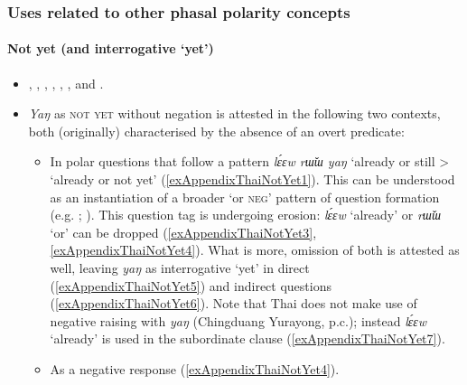 \subsubsection{Uses related to other phasal polarity concepts}
\paragraph{Not yet (and interrogative \lq yet\rq)}
\label{appendixThaiNotYet}
	\begin{itemize}
		\item  \Textcite[62]{vanBaar1997}, \textcite[97–100]{CampbellShaweevongs1982}, \textcite[60, 93, 98]{HigbieThinsan2002}, \textcite[284–286]{IwasakiIngkaphirom2005}, \textcite{Jenny2001}, \textcite[81, 84, 182–183]{Noss1964}, and \textcite[113, 150, 153, 157–159]{Smyth2002}.
		\item \textit{Yaŋ} as \textsc{not yet} without negation is attested in the following two contexts, both (originally) characterised by the absence of an overt predicate:
		\begin{itemize}
			\item In polar questions that follow a pattern \textit{lɛ́ɛw rɯ̌ɯ yaŋ} \lq already or still > \lq already or not yet\rq{ }(\ref{exAppendixThaiNotYet1}). This can be understood as an instantiation of a broader \lq or \textsc{neg}' pattern of question formation (e.g. \cite[283–284]{IwasakiIngkaphirom2005}; \cite[59–60]{HigbieThinsan2002}). This question tag is undergoing erosion: \textit{lɛ́ɛw} \lq already' or \textit{rɯ̌ɯ} \lq or' can be dropped (\ref{exAppendixThaiNotYet3}, \ref{exAppendixThaiNotYet4}). What is more, omission of both is attested as well, leaving \textit{yaŋ} as interrogative \lq yet' in direct (\ref{exAppendixThaiNotYet5}) and indirect questions (\ref{exAppendixThaiNotYet6}). Note that Thai does not make use of negative raising with \textit{yaŋ} (Chingduang Yurayong, p.c.); instead \textit{lɛ́ɛw} \lq already' is used in the subordinate clause (\ref{exAppendixThaiNotYet7}).
					\item As a negative response (\ref{exAppendixThaiNotYet4}).
		\end{itemize}
	\end{itemize}

